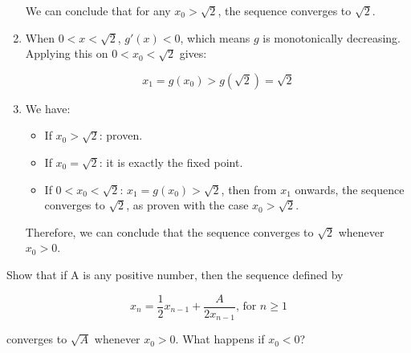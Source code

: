 \documentclass[../../../../Assignments]{subfiles}
\begin{document}
\begin{solution}
\begin{enumerate}[label = \alph*)]
            We can conclude that for any \(x_0 > \sqrt{2}\), the sequence
            converges to \(\sqrt{2}\).

        \item When \(0 < x < \sqrt{2}\), \(g'(x) < 0\), which means \(g\) is
            monotonically decreasing. Applying this on \(0 < x_0 < \sqrt{2}\)
            gives:

            \[x_1 = g(x_0) > g(\sqrt{2}) = \sqrt{2}\]

        \item We have:

            \begin{itemize}
                \item If \(x_0 > \sqrt{2}\): proven.
                \item If \(x_0 = \sqrt{2}\): it is exactly the fixed point.
                \item If \(0 < x_0 < \sqrt{2}\): \(x_1 = g(x_0) > \sqrt{2}\),
                    then from \(x_1\) onwards, the sequence converges to
                    \(\sqrt{2}\), as proven with the case \(x_0 > \sqrt{2}\).
            \end{itemize}

            Therefore, we can conclude that the sequence converges to
            \(\sqrt{2}\) whenever \(x_0 > 0\).
    \end{enumerate}
\end{solution}

\begin{exercise}
    \begin{tasks}
        \task Show that if A is any positive number, then the sequence defined
            by

            \[x_n = \frac{1}{2} x_{n - 1} + \frac{A}{2x_{n - 1}} \text{, for } n \geq 1\]

            converges to \(\sqrt{A}\) whenever \(x_0 > 0\).
        \task What happens if \(x_0 < 0\)?
    \end{tasks}
\end{exercise}
\end{document}
